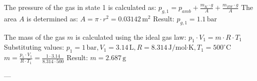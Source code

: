 The pressure of the gas in state 1 is calculated as:  
\( p_{g,1} = p_{amb} + \frac{m_K \cdot g}{A} + \frac{m_{EW} \cdot g}{A} \)  
The area \( A \) is determined as:  
\( A = \pi \cdot r^2 = 0.03142 \, \text{m}^2 \)  
Result: \( p_{g,1} = 1.1 \, \text{bar} \)  

The mass of the gas \( m \) is calculated using the ideal gas law:  
\( p_1 \cdot V_1 = m \cdot R \cdot T_1 \)  
Substituting values:  
\( p_1 = 1 \, \text{bar}, V_1 = 3.14 \, \text{L}, R = 8.314 \, \text{J/mol·K}, T_1 = 500^\circ \text{C} \)  
\( m = \frac{p_1 \cdot V_1}{R \cdot T_1} = \frac{1 \cdot 3.14}{8.314 \cdot 500} \)  
Result: \( m = 2.687 \, \text{g} \)  

---